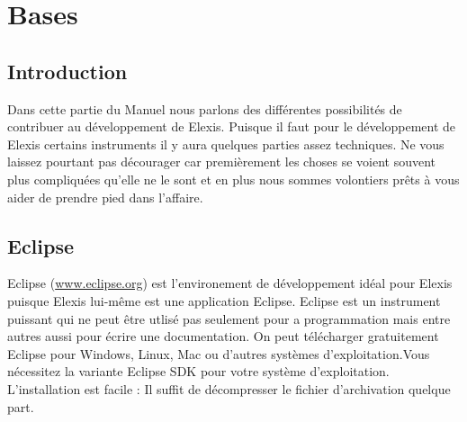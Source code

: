 %

\chapter{Bases}
\section{Introduction}
Dans cette partie du Manuel nous parlons des différentes possibilités de contribuer au développement de Elexis. Puisque il faut pour le développement de Elexis certains instruments il y aura quelques parties assez techniques. Ne vous laissez pourtant pas décourager car premièrement les choses se voient souvent plus compliquées qu'elle ne le sont et en plus nous sommes volontiers prêts à vous aider de prendre pied dans l'affaire.
\section{Eclipse}
\label{Eclipse}
Eclipse (\href{http://www.eclipse.org}{www.eclipse.org})  est l'environement de développement idéal pour Elexis puisque Elexis lui-même est une application Eclipse. Eclipse est un instrument puissant qui ne peut être utlisé pas seulement pour a programmation mais entre autres aussi pour écrire une documentation. On peut télécharger gratuitement Eclipse pour Windows, Linux, Mac ou d'autres systèmes d'exploitation.Vous nécessitez la variante  \glqq Eclipse SDK\grqq{} pour votre système d'exploitation. L'installation est facile : Il suffit de décompresser le fichier d'archivation quelque part.

